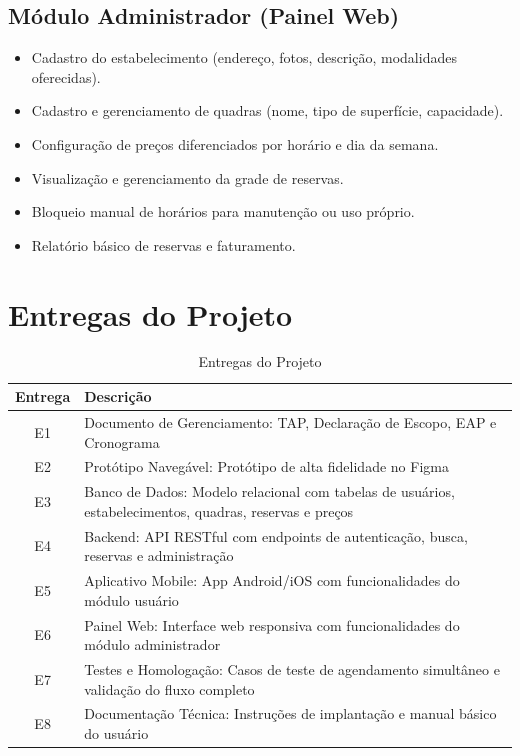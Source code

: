 \documentclass[12pt,a4paper,oneside]{report}
\begin{document}
\subsection{Módulo Administrador (Painel Web)}
\begin{itemize}
    \item Cadastro do estabelecimento (endereço, fotos, descrição, modalidades oferecidas).
    \item Cadastro e gerenciamento de quadras (nome, tipo de superfície, capacidade).
    \item Configuração de preços diferenciados por horário e dia da semana.
    \item Visualização e gerenciamento da grade de reservas.
    \item Bloqueio manual de horários para manutenção ou uso próprio.
    \item Relatório básico de reservas e faturamento.
\end{itemize}

\section{Entregas do Projeto}

\begin{table}[htbp]
\centering
\caption{Entregas do Projeto}
\begin{tabular}{c p{12cm}}
\toprule
\textbf{Entrega} & \textbf{Descrição} \\
\midrule
E1 & Documento de Gerenciamento: TAP, Declaração de Escopo, EAP e Cronograma \\
E2 & Protótipo Navegável: Protótipo de alta fidelidade no Figma \\
E3 & Banco de Dados: Modelo relacional com tabelas de usuários, estabelecimentos, quadras, reservas e preços \\
E4 & Backend: API RESTful com endpoints de autenticação, busca, reservas e administração \\
E5 & Aplicativo Mobile: App Android/iOS com funcionalidades do módulo usuário \\
E6 & Painel Web: Interface web responsiva com funcionalidades do módulo administrador \\
E7 & Testes e Homologação: Casos de teste de agendamento simultâneo e validação do fluxo completo \\
E8 & Documentação Técnica: Instruções de implantação e manual básico do usuário \\
\bottomrule
\end{tabular}
\end{table}
\end{document}

